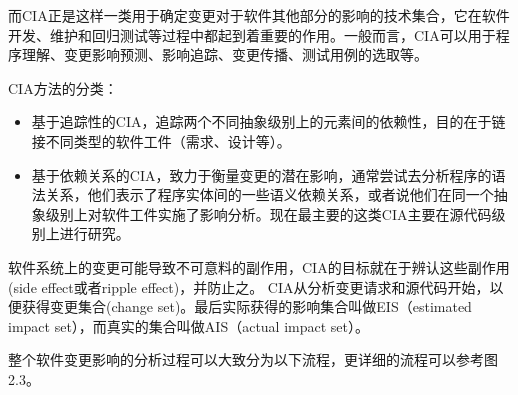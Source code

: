 而CIA正是这样一类用于确定变更对于软件其他部分的影响的技术集合\cite{li2013survey}，它在软件开发、维护和回归测试等过程中都起到着重要的作用\cite{acharya2011practical}。一般而言，CIA可以用于程序理解、变更影响预测、影响追踪、变更传播、测试用例的选取等。

CIA方法的分类：
\begin{itemize}
	\item 基于追踪性的CIA\cite{de2008traceability}，追踪两个不同抽象级别上的元素间的依赖性，目的在于链接不同类型的软件工件（需求、设计等）。

	\item 基于依赖关系的CIA\cite{law2003incremental}，致力于衡量变更的潜在影响，通常尝试去分析程序的语法关系，他们表示了程序实体间的一些语义依赖关系，或者说他们在同一个抽象级别上对软件工件实施了影响分析。现在最主要的这类CIA主要在源代码级别上进行研究。
\end{itemize}

软件系统上的变更可能导致不可意料的副作用，CIA的目标就在于辨认这些副作用(side effect或者ripple effect)\cite{bohner1996software}，并防止之。
CIA从分析变更请求和源代码开始，以便获得变更集合(change set)。最后实际获得的影响集合叫做EIS（estimated impact set），而真实的集合叫做AIS（actual impact set）。

整个软件变更影响的分析过程可以大致分为以下流程，更详细的流程可以参考图2.3\cite{de2008traceability,bohner2002software}。

